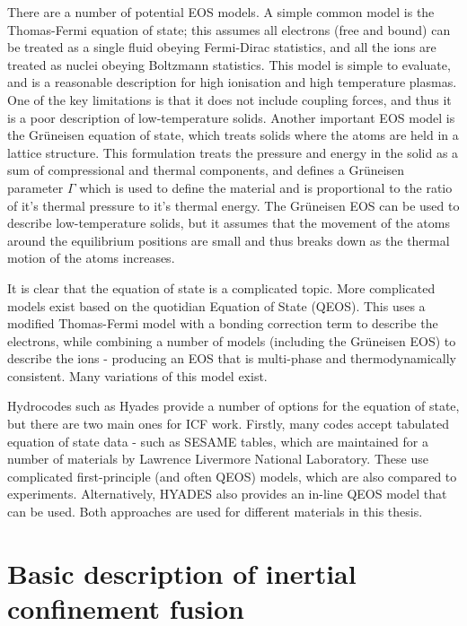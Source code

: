 There are a number of potential EOS models. A simple common model is the Thomas-Fermi equation of state; this assumes all electrons (free and bound) can be treated as a single fluid obeying Fermi-Dirac statistics, and all the ions are treated as nuclei obeying Boltzmann statistics. This model is simple to evaluate, and is a reasonable description for high ionisation and high temperature plasmas. One of the key limitations is that it does not include coupling forces, and thus it is a poor description of low-temperature solids. Another important EOS model is the Gr{\"u}neisen equation of state, which treats solids where the atoms are held in a lattice structure. This formulation treats the pressure and energy in the solid as a sum of compressional and thermal components, and defines a Gr{\"u}neisen parameter $\Gamma$ which is used to define the material and is proportional to the ratio of it's thermal pressure to it's thermal energy. The Gr{\"u}neisen EOS can be used to describe low-temperature solids, but it assumes that the movement of the atoms around the equilibrium positions are small and thus breaks down as the thermal motion of the atoms increases.

It is clear that the equation of state is a complicated topic. More complicated models exist based on the quotidian Equation of State (QEOS). This uses a modified Thomas-Fermi model with a bonding correction term to describe the electrons, while combining a number of models (including the Gr{\"u}neisen EOS) to describe the ions - producing an EOS that is multi-phase and thermodynamically consistent. Many variations of this model exist. 

Hydrocodes such as Hyades provide a number of options for the equation of state, but there are two main ones for ICF work. Firstly, many codes accept tabulated equation of state data - such as SESAME tables, which are maintained for a number of materials by Lawrence Livermore National Laboratory. These use complicated first-principle (and often QEOS) models, which are also compared to experiments. Alternatively, HYADES also provides an in-line QEOS model that can be used. Both approaches are used for different materials in this thesis.

\section{Basic description of inertial confinement fusion}

